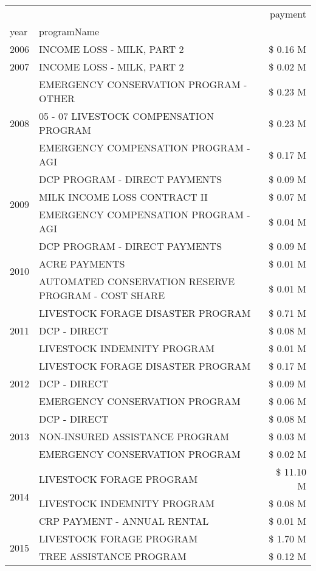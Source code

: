 \begin{tabular}{llr}
\toprule
 &  & payment \\
year & programName &  \\
\midrule
2006 & INCOME LOSS - MILK, PART 2 & \$ 0.16 M \\
\cline{1-3}
2007 & INCOME LOSS - MILK, PART 2 & \$ 0.02 M \\
\cline{1-3}
\multirow[t]{3}{*}{2008} & EMERGENCY CONSERVATION PROGRAM - OTHER & \$ 0.23 M \\
 & 05 - 07 LIVESTOCK COMPENSATION PROGRAM & \$ 0.23 M \\
 & EMERGENCY COMPENSATION PROGRAM - AGI & \$ 0.17 M \\
\cline{1-3}
\multirow[t]{3}{*}{2009} & DCP PROGRAM - DIRECT PAYMENTS & \$ 0.09 M \\
 & MILK INCOME LOSS CONTRACT II & \$ 0.07 M \\
 & EMERGENCY COMPENSATION PROGRAM - AGI & \$ 0.04 M \\
\cline{1-3}
\multirow[t]{3}{*}{2010} & DCP PROGRAM - DIRECT PAYMENTS & \$ 0.09 M \\
 & ACRE PAYMENTS & \$ 0.01 M \\
 & AUTOMATED CONSERVATION RESERVE PROGRAM - COST SHARE & \$ 0.01 M \\
\cline{1-3}
\multirow[t]{3}{*}{2011} & LIVESTOCK FORAGE DISASTER PROGRAM & \$ 0.71 M \\
 & DCP - DIRECT & \$ 0.08 M \\
 & LIVESTOCK INDEMNITY PROGRAM & \$ 0.01 M \\
\cline{1-3}
\multirow[t]{3}{*}{2012} & LIVESTOCK FORAGE DISASTER PROGRAM & \$ 0.17 M \\
 & DCP - DIRECT & \$ 0.09 M \\
 & EMERGENCY CONSERVATION PROGRAM & \$ 0.06 M \\
\cline{1-3}
\multirow[t]{3}{*}{2013} & DCP - DIRECT & \$ 0.08 M \\
 & NON-INSURED ASSISTANCE PROGRAM & \$ 0.03 M \\
 & EMERGENCY CONSERVATION PROGRAM & \$ 0.02 M \\
\cline{1-3}
\multirow[t]{3}{*}{2014} & LIVESTOCK FORAGE PROGRAM & \$ 11.10 M \\
 & LIVESTOCK INDEMNITY PROGRAM & \$ 0.08 M \\
 & CRP PAYMENT - ANNUAL RENTAL & \$ 0.01 M \\
\cline{1-3}
\multirow[t]{3}{*}{2015} & LIVESTOCK FORAGE PROGRAM & \$ 1.70 M \\
 & TREE ASSISTANCE PROGRAM & \$ 0.12 M \\

\end{tabular}
